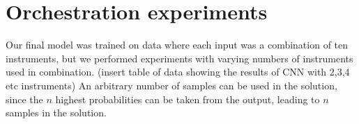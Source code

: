 \documentclass{article}
\begin{document}

\section{Orchestration experiments}

Our final model was trained on data where each input was a combination of ten instruments, but we performed experiments with varying numbers of instruments used in combination. (insert table of data showing the results of CNN with 2,3,4 etc instruments) An arbitrary number of samples can be used in the solution, since the $n$ highest probabilities can be taken from the output, leading to $n$ samples in the solution.
\end{document}

